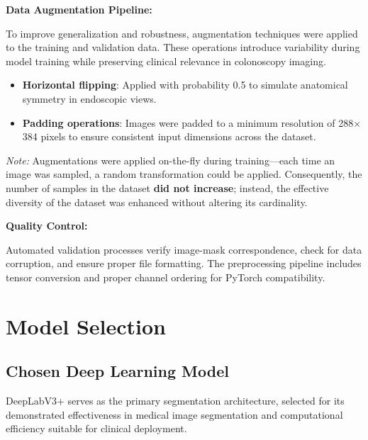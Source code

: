 \documentclass[a4paper,12pt]{report}
\begin{document}
\vspace{1em} %

\noindent\textbf{\large Data Augmentation Pipeline:}
\vspace{0.5em}

To improve generalization and robustness, augmentation techniques were applied to the training and validation data. These operations introduce variability during model training while preserving clinical relevance in colonoscopy imaging.

\begin{itemize}
\item \textbf{Horizontal flipping}: Applied with probability 0.5 to simulate anatomical symmetry in endoscopic views.
\item \textbf{Padding operations}: Images were padded to a minimum resolution of 288$\times$384 pixels to ensure consistent input dimensions across the dataset.
\end{itemize}

\noindent\textit{Note:} Augmentations were applied on-the-fly during training—each time an image was sampled, a random transformation could be applied. Consequently, the number of samples in the dataset \textbf{did not increase}; instead, the effective diversity of the dataset was enhanced without altering its cardinality.

\vspace{1em} %

\noindent\textbf{\large Quality Control:}
\vspace{0.5em}

Automated validation processes verify image-mask correspondence, check for data corruption, and ensure proper file formatting. The preprocessing pipeline includes tensor conversion and proper channel ordering for PyTorch compatibility.

\section{Model Selection}
\subsection{Chosen Deep Learning Model}

DeepLabV3+ serves as the primary segmentation architecture, selected for its demonstrated effectiveness in medical image segmentation and computational efficiency suitable for clinical deployment.
\vspace{1em}
\end{document}
